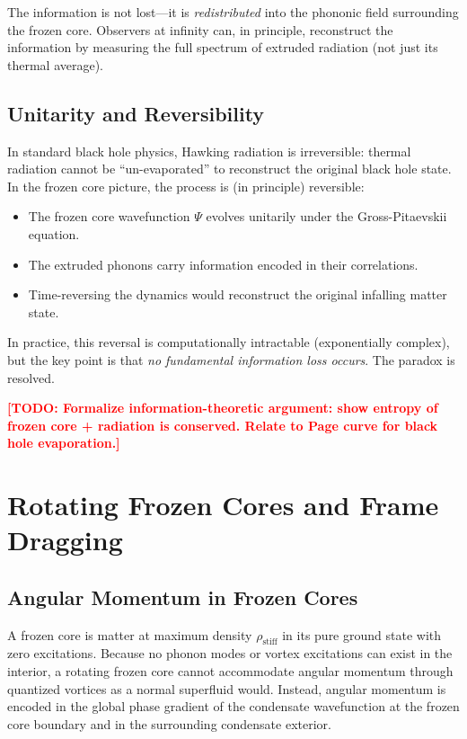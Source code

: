 \documentclass[12pt,a4paper]{article}
\newcommand{\TODO}[1]{\textcolor{red}{\textbf{[TODO: #1]}}}
\newcommand{\planckfield}{\Psi}
\newcommand{\rhostiff}{\rho_\text{stiff}}
\theoremstyle{definition}
\begin{document}
The information is not lost—it is \emph{redistributed} into the phononic field surrounding the frozen core. Observers at infinity can, in principle, reconstruct the information by measuring the full spectrum of extruded radiation (not just its thermal average).

\subsection{Unitarity and Reversibility}
\label{subsec:unitarity}

In standard black hole physics, Hawking radiation is irreversible: thermal radiation cannot be ``un-evaporated'' to reconstruct the original black hole state. In the frozen core picture, the process is (in principle) reversible:

\begin{itemize}
  \item The frozen core wavefunction $\planckfield$ evolves unitarily under the Gross-Pitaevskii equation.
  \item The extruded phonons carry information encoded in their correlations.
  \item Time-reversing the dynamics would reconstruct the original infalling matter state.
\end{itemize}

In practice, this reversal is computationally intractable (exponentially complex), but the key point is that \emph{no fundamental information loss occurs}. The paradox is resolved.

\TODO{Formalize information-theoretic argument: show entropy of frozen core + radiation is conserved. Relate to Page curve for black hole evaporation.}

\section{Rotating Frozen Cores and Frame Dragging}
\label{sec:rotating_cores}

\subsection{Angular Momentum in Frozen Cores}
\label{subsec:frozen_core_rotation}

A frozen core is matter at maximum density $\rhostiff$ in its pure ground state with zero excitations. Because no phonon modes or vortex excitations can exist in the interior, a rotating frozen core cannot accommodate angular momentum through quantized vortices as a normal superfluid would. Instead, angular momentum is encoded in the global phase gradient of the condensate wavefunction at the frozen core boundary and in the surrounding condensate exterior.
\end{document}
